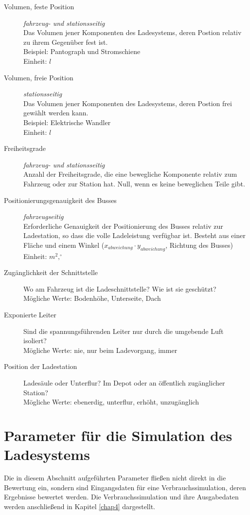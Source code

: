 \begin{description}
	\item [Volumen, feste Position] \emph{fahrzeug- und stationsseitig}\\
	Das Volumen jener Komponenten des Ladesystems, deren Postion relativ zu ihrem Gegenüber fest ist.\\
	Beispiel: Pantograph und Stromschiene\\
	Einheit: $l$
	\item [Volumen, freie Position] \emph{stationsseitig}\\
	Das Volumen jener Komponenten des Ladesystems, deren Postion frei gewählt werden kann.\\
	Beispiel: Elektrische Wandler\\
	Einheit: $l$
	\item [Freiheitsgrade] \emph{fahrzeug- und stationsseitig}\\
	Anzahl der Freiheitsgrade, die eine bewegliche Komponente relativ zum Fahrzeug oder zur Station hat. Null, wenn es keine beweglichen Teile gibt.
	\item [Positionierungsgenauigkeit des Busses] \emph{fahrzeugseitig} \\
	Erforderliche Genauigkeit der Positionierung des Busses relativ zur Ladestation, so dass die volle Ladeleistung verfügbar ist. Besteht aus einer Fläche und einem Winkel ($x_{abweichung}\cdot y_{abweichung}$, Richtung des Busses)\\
	Einheit: $m^2,^\circ$
	\item [Zugänglichkeit der Schnittstelle]
	Wo am Fahrzeug ist die Ladeschnittstelle? Wie ist sie geschützt?\\
	Mögliche Werte: Bodenhöhe, Unterseite, Dach
	\item [Exponierte Leiter]
	Sind die spannungsführenden Leiter nur durch die umgebende Luft isoliert?\\
	Mögliche Werte: nie, nur beim Ladevorgang, immer
	\item [Position der Ladestation]
	Ladesäule oder Unterflur? Im Depot oder an öffentlich zugänglicher Station?\\
	Mögliche Werte: ebenerdig, unterflur, erhöht, unzugänglich	
\end{description}

\section{Parameter für die Simulation des Ladesystems}
\label{parameterIndirekt}
Die in diesem Abschnitt aufgeführten Parameter fließen nicht direkt in die Bewertung ein, sondern sind Eingangsdaten für eine Verbrauchssimulation, deren Ergebnisse bewertet werden. Die Verbrauchssimulation und ihre Ausgabedaten werden anschließend in Kapitel \ref{chap4} dargestellt.

